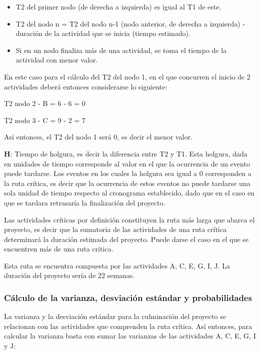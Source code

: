\documentclass{mylib/reporteCorto}
\begin{document}
\begin{itemize}
	\item T2 del primer nodo (de derecha a izquierda) es igual al T1 de este.
	\item T2 del nodo n = T2 del nodo n-1 (nodo anterior, de derecha a izquierda) - duración de la actividad que se inicia (tiempo estimado).
	\item Si en un nodo finaliza más de una actividad, se toma el tiempo de la actividad con menor valor.
\end{itemize}

En este caso para el cálculo del T2 del nodo 1, en el que concurren el inicio de 2 actividades deberá entonces considerarse lo siguiente:


T2 nodo 2 - B = 6 - 6 = 0

T2 nodo 3 - C = 9 - 2 = 7

Así entonces, el T2 del nodo 1 será 0, es decir el menor valor.

\textbf{H}: Tiempo de holgura, es decir la diferencia entre T2 y T1. Esta holgura, dada en unidades de tiempo corresponde al valor en el que la ocurrencia de un evento puede tardarse. Los eventos en los cuales la holgura sea igual a 0 corresponden a la ruta crítica, es decir que la ocurrencia de estos eventos no puede tardarse una sola unidad de tiempo respecto al cronograma establecido, dado que en el caso en que se tardara retrasaría la finalización del proyecto.

Las actividades críticas por definición constituyen la ruta más larga que abarca el proyecto, es decir que la sumatoria de las actividades de una ruta crítica determinará la duración estimada del proyecto. Puede darse el caso en el que se encuentren más de una ruta crítica.


Esta ruta se encuentra compuesta por las actividades A, C, E, G, I, J. La duración del proyecto sería de 22 semanas.

\subsubsection{Cálculo de la varianza, desviación estándar y probabilidades}

La varianza y la desviación estándar para la culminación del proyecto se relacionan con las actividades que comprenden la ruta crítica. Así entonces, para calcular la varianza basta con sumar las varianzas de las actividades A, C, E, G, I y J:
\end{document}
